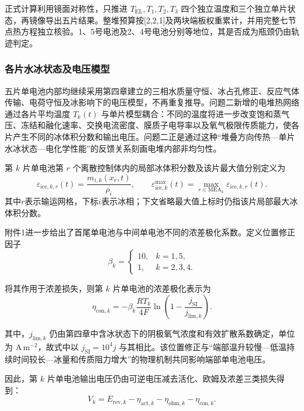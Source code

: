 \documentclass[bwprint]{gmcmthesis}
\numberwithin{equation}{section}
\numberwithin{figure}{section}
\begin{document}
正式计算利用镜面对称性，只推进 $T_{\mathrm{EL}},T_1,T_2,T_3$ 四个独立温度和三个独立单片状态，再镜像导出五片结果。整堆预算按[2,2,1]及两块端板权重累计，并用完整七节点热方程独立核验。1、5号电池及2、4号电池分别等地位，其是否成为瓶颈仍由轨迹判定。

\subsubsection{各片水冰状态及电压模型}

五片单电池内部均继续采用第四章建立的三相水质量守恒、冰占孔修正、反应气体传输、电荷守恒及冰影响下的电压模型，不再重复推导。问题二新增的电堆热网络通过各片平均温度 \(T_k(t)\) 与单片模型耦合：不同的温度将进一步改变饱和蒸气压、冻结和融化速率、交换电流密度、膜质子电导率以及氧气极限传质能力，使各片产生不同的冰体积分数和输出电压。问题二正是通过这种“堆叠方向传热—单片水冰状态—电化学性能”的反馈关系刻画电堆内部非均匀性。

 第 \(k\) 片单电池第 \(r\) 个离散控制体内的局部冰体积分数及该片最大值分别定义为
\begin{equation}
\varepsilon_{\text{ice},k,r}(t) = \frac{m_{i,k}(x_r, t)}{\rho_i}, \qquad \varepsilon_{\text{ice},k}^{\text{max}}(t) = \max_{r \in \text{MEA}_k} \varepsilon_{\text{ice},k,r}(t). \label{eq:src:5-38}
\end{equation}
其中$r$表示输运网格，下标$i$表示冰相；下文省略最大值上标时仍指该片局部最大冰体积分数。

 附件1进一步给出了首尾单电池与中间单电池不同的浓差极化系数。定义位置修正因子
\begin{equation}
\beta_k = \begin{cases} 10, & k = 1, 5, \\ 1, & k = 2, 3, 4. \end{cases} \label{eq:src:5-39}
\end{equation}

 将其作用于浓差损失，则第 \(k\) 片单电池的浓差极化表示为
\begin{equation}
\eta_{\text{con},k} = -\beta_k \frac{RT_k}{4F} \ln \left( 1 - \frac{j_{\mathrm{SI}}}{j_{\text{lim},k}} \right). \label{eq:src:5-40}
\end{equation}

 其中，\(j_{\text{lim},k}\) 仍由第四章中含冰状态下的阴极氧气浓度和有效扩散系数确定，单位为 $\mathrm{A\,m^{-2}}$，故式中以 $j_{\mathrm{SI}}=10^4j$ 与其相比。该位置修正与“端部温升较慢—低温持续时间较长—冰量和传质阻力增大”的物理机制共同影响端部单电池电压。

 因此，第 \(k\) 片单电池输出电压仍由可逆电压减去活化、欧姆及浓差三类损失得到：
\begin{equation}
V_k = E_{\text{rev},k} - \eta_{\text{act},k} - \eta_{\text{ohm},k} - \eta_{\text{con},k}. \label{eq:src:5-41}
\end{equation}
\end{document}
